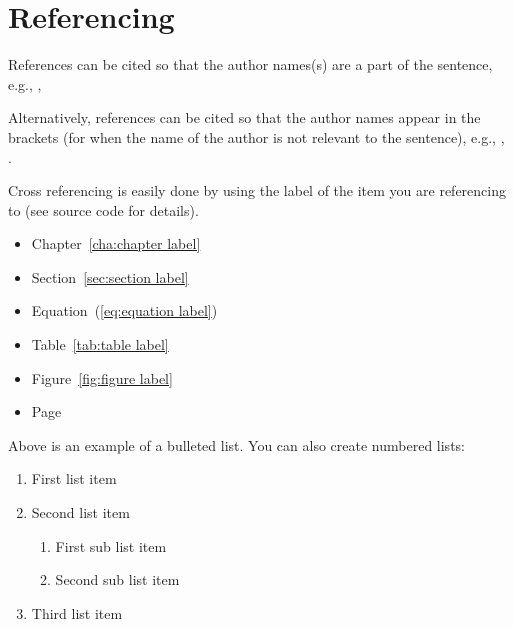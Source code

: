 \section{Referencing}
References can be cited so that the author names(s) are a part of the sentence, e.g., \textcite{stroud:2013}, \textcite{harten:1983}

Alternatively, references can be cited so that the author names appear in the brackets (for when the name of the author is not relevant to the sentence), e.g., \parencite{stroud:2013},  \parencite{harten:1983}.

Cross referencing is easily done by using the label of the item you are referencing to (see source code for details).
\begin{itemize}
    \item Chapter~\ref{cha:chapter label}
    \item Section~\ref{sec:section label}
    \item Equation~(\ref{eq:equation label})
    \item Table~\ref{tab:table label}
    \item Figure~\ref{fig:figure label}
    \item Page~\pageref{eq:equation label}
\end{itemize}

Above is an example of a bulleted list. You can also create numbered lists:
\begin{enumerate}
    \item First list item
    \item Second list item
          \begin{enumerate}
              \item First sub list item
              \item Second sub list item
          \end{enumerate}
    \item Third list item
\end{enumerate}